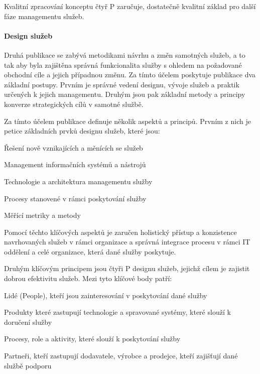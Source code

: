 \documentclass[
  digital,     %
  twoside,     %
  lof,         %
  lot,         %
]{fithesis4}
\begin{document}
Kvalitní zpracování konceptu čtyř P zaručuje, dostatečně kvalitní základ pro další fáze managementu služeb.


\paragraph{Design služeb}
Druhá publikace se zabývá metodikami návrhu a změn samotných služeb, a to tak aby byla zajištěna správná funkcionalita služby s ohledem na požadované obchodní cíle a jejich případnou změnu. Za tímto účelem poskytuje publikace dva základní postupy. Prvním je správné vedení designu, vývoje služeb a praktik určených k jejich managementu. Druhým jsou pak základní metody a principy konverze strategických cílů v samotné službě.\parencite[s.~21]{Carlidge2007}

Za tímto účelem publikace definuje několik aspektů a principů. Prvním z nich je petice základních prvků designu služeb, které jsou: \parencite[s.~22]{Carlidge2007}
\begin{compactitem}
    \item Řešení nově vznikajících a měnících se služeb
    \item Management informačních systémů a nástrojů
    \item Technologie a architektura managementu služby
    \item Procesy stanovené v rámci poskytování služby
    \item Měřící metriky a metody
\end{compactitem}
Pomocí těchto klíčových aspektů je zaručen holistický přístup a konzistence navrhovaných služeb v rámci organizace a správná integrace procesu v rámci IT oddělení a celé organizace, která dané služby poskytuje. \parencite[s.~22]{Carlidge2007}

Druhým klíčovým principem jsou čtyři P designu služeb, jejichž cílem je zajistit dobrou efektivitu služeb. Mezi tyto klíčové body patří:\parencite[s.~22]{Carlidge2007}

\begin{compactitem}
    \item Lidé (People), kteří jsou zainteresování v poskytování dané služby
    \item Produkty které zastupují technologie a spravované systémy, které slouží k doručení služby
    \item Procesy, role a aktivity, které slouží k poskytování služby
    \item Partneři, kteří zastupují dodavatele, výrobce a prodejce, kteří zajišťují dané službě podporu
\end{compactitem}
\end{document}
